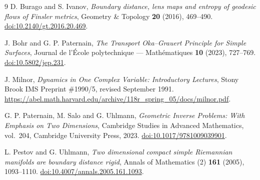 \documentclass[11pt]{article}
\theoremstyle{remark}
\begin{document}
\begin{thebibliography}{9}
D. Burago and S. Ivanov,
\emph{Boundary distance, lens maps and entropy of geodesic flows of Finsler metrics},
Geometry \& Topology \textbf{20} (2016), 469--490.
\href{https://doi.org/10.2140/gt.2016.20.469}{doi:10.2140/gt.2016.20.469}.

J. Bohr and G. P. Paternain,
\emph{The Transport Oka--Grauert Principle for Simple Surfaces},
Journal de l'\'Ecole polytechnique --- Math\'ematiques \textbf{10} (2023), 727--769.
\href{https://doi.org/10.5802/jep.231}{doi:10.5802/jep.231}.

J. Milnor,
\emph{Dynamics in One Complex Variable: Introductory Lectures},
Stony Brook IMS Preprint \#1990/5, revised September 1991.
\url{https://abel.math.harvard.edu/archive/118r_spring_05/docs/milnor.pdf}.

G. P. Paternain, M. Salo and G. Uhlmann,
\emph{Geometric Inverse Problems: With Emphasis on Two Dimensions},
Cambridge Studies in Advanced Mathematics, vol.~204,
Cambridge University Press, 2023.
\href{https://doi.org/10.1017/9781009039901}{doi:10.1017/9781009039901}.

L. Pestov and G. Uhlmann,
\emph{Two dimensional compact simple Riemannian manifolds are boundary distance rigid},
Annals of Mathematics (2) \textbf{161} (2005), 1093--1110.
\href{https://doi.org/10.4007/annals.2005.161.1093}{doi:10.4007/annals.2005.161.1093}.
\end{thebibliography}
\end{document}
